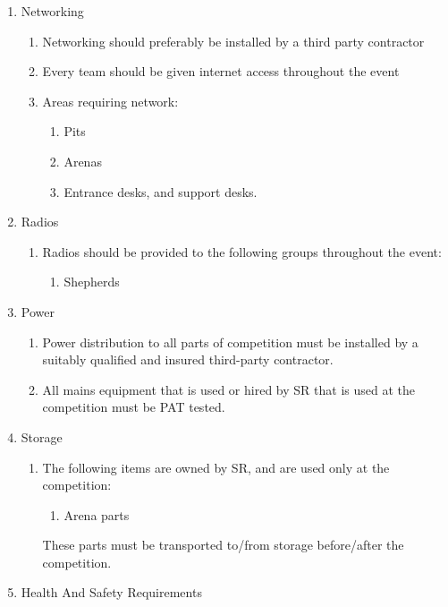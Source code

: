 \begin{enumerate}
\begin{enumerate}
  \item Networking
    \begin{enumerate}
    \item Networking should preferably be installed by a third party contractor
    \item Every team should be given internet access throughout the event
    \item Areas requiring network:
      \begin{enumerate}
      \item Pits
      \item Arenas
      \item Entrance desks, and support desks.
      \end{enumerate}
    \end{enumerate}

  \item Radios
    \begin{enumerate}
    \item Radios should be provided to the following groups throughout the event:
      \begin{enumerate}
      \item Shepherds
      \end{enumerate}
    \end{enumerate}

  \item Power
    \begin{enumerate}
    \item Power distribution to all parts of competition must be installed by a suitably qualified and insured third-party contractor.
      \item All mains equipment that is used or hired by SR that is used at the competition must be PAT tested.
    \end{enumerate}

  \item Storage
    \begin{enumerate}
    \item The following items are owned by SR, and are used only at the competition:
      \begin{enumerate}
      \item Arena parts
      \end{enumerate}
      These parts must be transported to/from storage before/after the competition.
    \end{enumerate}


\item Health And Safety Requirements


\end{enumerate}
\end{enumerate}
